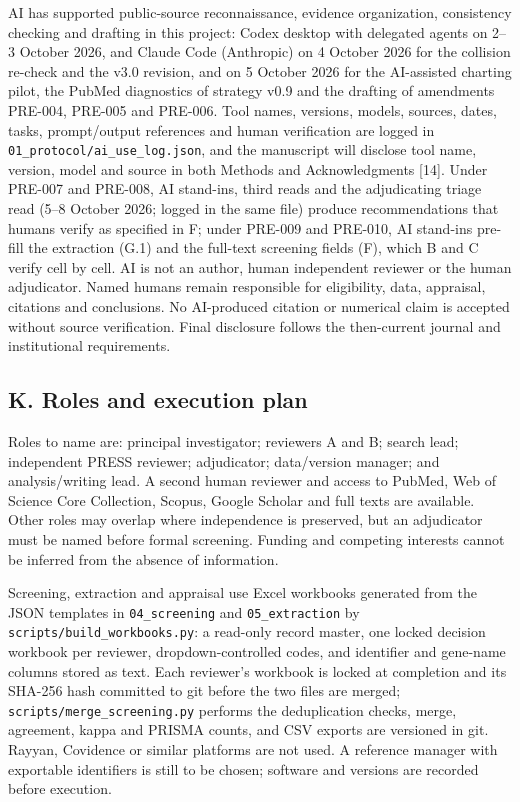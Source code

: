 \documentclass[
  11pt,
  a4paper,
]{article}
\begin{document}
AI has supported public-source reconnaissance, evidence organization,
consistency checking and drafting in this project: Codex desktop with
delegated agents on 2--3 October 2026, and Claude Code (Anthropic) on 4
October 2026 for the collision re-check and the v3.0 revision, and on 5
October 2026 for the AI-assisted charting pilot, the PubMed diagnostics
of strategy v0.9 and the drafting of amendments PRE-004, PRE-005 and
PRE-006. Tool names, versions, models, sources, dates, tasks,
prompt/output references and human verification are logged in
\texttt{01\_protocol/ai\_use\_log.json}, and the manuscript will
disclose tool name, version, model and source in both Methods and
Acknowledgments {[}14{]}. Under PRE-007 and PRE-008, AI stand-ins, third
reads and the adjudicating triage read (5--8 October 2026; logged in the
same file) produce recommendations that humans verify as specified in F;
under PRE-009 and PRE-010, AI stand-ins pre-fill the extraction (G.1)
and the full-text screening fields (F), which B and C verify cell by
cell. AI is not an author, human independent reviewer or the human
adjudicator. Named humans remain responsible for eligibility, data,
appraisal, citations and conclusions. No AI-produced citation or
numerical claim is accepted without source verification. Final
disclosure follows the then-current journal and institutional
requirements.

\subsection{K. Roles and execution
plan}\label{k.-roles-and-execution-plan}

Roles to name are: principal investigator; reviewers A and B; search
lead; independent PRESS reviewer; adjudicator; data/version manager; and
analysis/writing lead. A second human reviewer and access to PubMed, Web
of Science Core Collection, Scopus, Google Scholar and full texts are
available. Other roles may overlap where independence is preserved, but
an adjudicator must be named before formal screening. Funding and
competing interests cannot be inferred from the absence of information.

Screening, extraction and appraisal use Excel workbooks generated from
the JSON templates in \texttt{04\_screening} and \texttt{05\_extraction}
by \texttt{scripts/build\_workbooks.py}: a read-only record master, one
locked decision workbook per reviewer, dropdown-controlled codes, and
identifier and gene-name columns stored as text. Each reviewer's
workbook is locked at completion and its SHA-256 hash committed to git
before the two files are merged; \texttt{scripts/merge\_screening.py}
performs the deduplication checks, merge, agreement, kappa and PRISMA
counts, and CSV exports are versioned in git. Rayyan, Covidence or
similar platforms are not used. A reference manager with exportable
identifiers is still to be chosen; software and versions are recorded
before execution.
\end{document}
